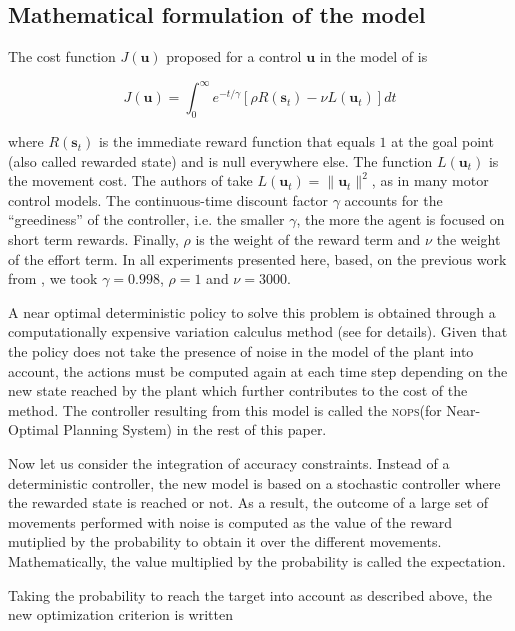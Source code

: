 \documentclass[10pt]{article}
\newcommand\ops{\textsc{nops}\xspace}
\renewcommand\vec[1]{\boldsymbol{#1}} %
\begin{document}
\subsection{Mathematical formulation of the model}
\label{sec:math_model}

The cost function $J(\vec{u})$ proposed for a control $\vec{u}$ in the model of \cite{rigoux12} is

\begin{equation}
\label{eq:criterion}
 J(\vec{u}) = \int_0^{\infty} e^{-t/\gamma} [ \rho R(\vec{s}_t) - \nu L(\vec{u}_t) ] dt
\end{equation}

where $R(\vec{s}_t)$ is the immediate reward function that equals $1$ at the goal point (also called rewarded state) and is null everywhere else. The function $L(\vec{u}_t)$ is the movement cost. The authors of \cite{rigoux12} take $L(\vec{u}_t) = \|\vec{u}_t\|^2$, as in many motor control models. 
The continuous-time discount factor $\gamma$ accounts for the ``greediness'' of the controller, i.e. the smaller $\gamma$, the more the agent is focused on short term rewards.
Finally, $\rho$ is the weight of the reward term and $\nu$ the weight of the effort term.
In all experiments presented here, based, on the previous work from \cite{rigoux12}, we took $\gamma=0.998$, $\rho=1$ and $\nu=3000$.

A near optimal deterministic policy to solve this problem is obtained through a computationally expensive variation calculus method (see \cite{rigoux_these} for details).
Given that the policy does not take the presence of noise in the model of the plant into account, 
the actions must be computed again at each time step depending on the new state reached by the plant
which further contributes to the cost of the method.
The controller resulting from this model is called the \ops (for Near-Optimal Planning System) in the rest of this paper.

Now let us consider the integration of accuracy constraints. Instead of a deterministic controller, the new model is based on a stochastic controller where the rewarded state is reached or not. As a result, the outcome of a large set of movements performed with noise is computed as the value of the reward mutiplied by the probability to obtain it over the different movements. 
Mathematically, the value multiplied by the probability is called the expectation.

Taking the probability to reach the target into account as described above, the new optimization criterion is written
\end{document}
